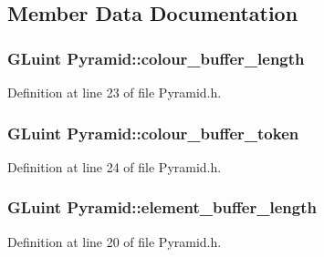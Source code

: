 \subsection{Member Data Documentation}
\hypertarget{class_pyramid_add41d4b357644ea0dd2cbf5ad7ebf59b}{}
\subsubsection[{colour\+\_\+buffer\+\_\+length}]{\setlength{\rightskip}{0pt plus 5cm}G\+Luint Pyramid\+::colour\+\_\+buffer\+\_\+length\hspace{0.3cm}{\ttfamily [private]}}\label{class_pyramid_add41d4b357644ea0dd2cbf5ad7ebf59b}


Definition at line 23 of file Pyramid.\+h.

\hypertarget{class_pyramid_a20c19661fc7ece0b2122af63501a3f0c}{}
\subsubsection[{colour\+\_\+buffer\+\_\+token}]{\setlength{\rightskip}{0pt plus 5cm}G\+Luint Pyramid\+::colour\+\_\+buffer\+\_\+token\hspace{0.3cm}{\ttfamily [private]}}\label{class_pyramid_a20c19661fc7ece0b2122af63501a3f0c}


Definition at line 24 of file Pyramid.\+h.

\hypertarget{class_pyramid_a9692c05fe1796a90a4bf995bea95f7f2}{}
\subsubsection[{element\+\_\+buffer\+\_\+length}]{\setlength{\rightskip}{0pt plus 5cm}G\+Luint Pyramid\+::element\+\_\+buffer\+\_\+length\hspace{0.3cm}{\ttfamily [private]}}\label{class_pyramid_a9692c05fe1796a90a4bf995bea95f7f2}


Definition at line 20 of file Pyramid.\+h.

\hypertarget{class_pyramid_a760ec3c4f40ea025e57f0f95d118a921}{}
